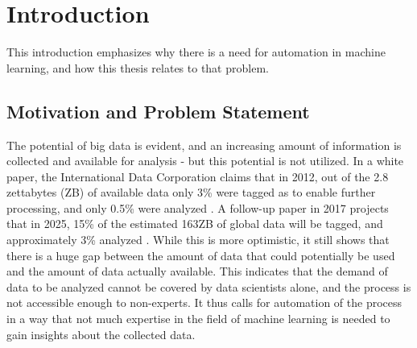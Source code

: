 \chapter{Introduction}
\label{sec:intro}
This introduction emphasizes why there is a need for automation in machine learning, and how this thesis relates to that problem. 

\section{Motivation and Problem Statement}
\label{sec:intro:motivation}
The potential of big data is evident, and an increasing amount of information is collected and available for analysis - but this potential is not utilized. In a white paper, the International Data Corporation claims that in 2012, out of the 2.8 zettabytes (ZB) of available data only 3\% were tagged as to enable further processing, and only 0.5\% were analyzed \cite{gantz2012the}. A follow-up paper in 2017 projects that in 2025, 15\% of the estimated 163ZB of global data will be tagged, and approximately 3\% analyzed \cite{gantz2017data}. While this is more optimistic, it still shows that there is a huge gap between the amount of data that could potentially be used and the amount of data actually available. This indicates that the demand of data to be analyzed cannot be covered by data scientists alone, and the process is not accessible enough to non-experts. It thus calls for automation of the process in a way that not much expertise in the field of machine learning is needed to gain insights about the collected data.

